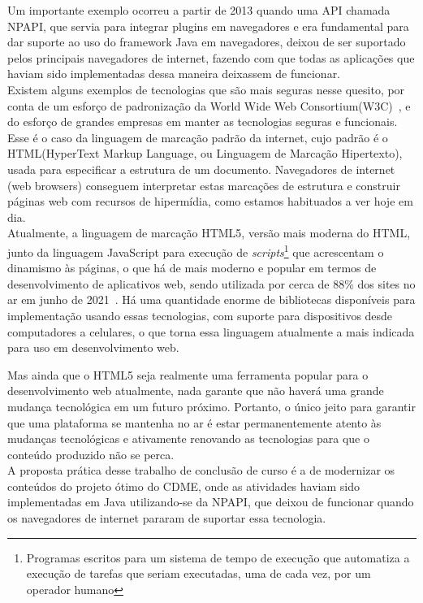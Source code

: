 Um importante exemplo ocorreu a partir de 2013 quando uma API chamada NPAPI, que servia para integrar plugins em navegadores e era fundamental para dar suporte ao uso do framework Java em navegadores, deixou de ser suportado pelos principais navegadores de internet, fazendo com que todas as aplicações que haviam sido implementadas dessa maneira deixassem de funcionar.
\\

Existem alguns exemplos de tecnologias que são mais seguras nesse quesito, por conta de um esforço de padronização da World Wide Web Consortium(W3C)~\cite{internetleiner2009brief}, e do esforço de grandes empresas em manter as tecnologias seguras e funcionais. Esse é o caso da linguagem de marcação padrão da internet, cujo padrão é o HTML(HyperText Markup Language, ou Linguagem de Marcação Hipertexto), usada para especificar a estrutura de um documento. Navegadores de internet (web browsers) conseguem interpretar estas marcações de estrutura e construir páginas web com recursos de hipermídia, como estamos habituados a ver hoje em dia.
\\

Atualmente, a linguagem de marcação HTML5, versão mais moderna do HTML, junto da linguagem JavaScript para execução de \textit{scripts}\footnote{Programas escritos para um sistema de tempo de execução que automatiza a execução de tarefas que seriam executadas, uma de cada vez, por um operador humano} que acrescentam o dinamismo às páginas, o que há de mais moderno e popular em termos de desenvolvimento de aplicativos web, sendo utilizada por cerca de 88\% dos sites no ar em junho de 2021~\cite{html5-percentage}. Há uma quantidade enorme de bibliotecas disponíveis para implementação usando essas tecnologias, com suporte para dispositivos desde computadores a celulares, o que torna essa linguagem atualmente a mais indicada para uso em desenvolvimento web.

Mas ainda que o HTML5 seja realmente uma ferramenta popular para o desenvolvimento web atualmente, nada garante que não haverá uma grande mudança tecnológica em um futuro próximo. Portanto, o único jeito para garantir que uma plataforma se mantenha no ar é estar permanentemente atento às mudanças tecnológicas e ativamente renovando as tecnologias para que o conteúdo produzido não se perca.
\\

A proposta prática desse trabalho de conclusão de curso é a de modernizar os conteúdos do projeto ótimo do CDME, onde as atividades haviam sido implementadas em Java utilizando-se da NPAPI, que deixou de funcionar quando os navegadores de internet pararam de suportar essa tecnologia.